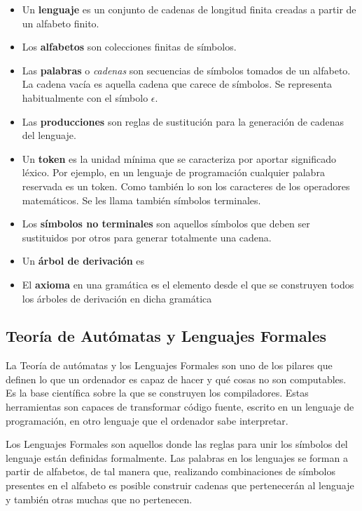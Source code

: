 \begin{itemize}
    \item Un \textbf{lenguaje} es un conjunto de cadenas de longitud finita creadas a partir de un alfabeto finito.
    \item Los \textbf{alfabetos} son colecciones finitas de símbolos.
    \item Las \textbf{palabras} o \emph{cadenas} son secuencias de símbolos tomados de un alfabeto. La cadena vacía es aquella cadena que carece de símbolos. Se representa habitualmente con el símbolo $\epsilon$.
    \item Las \textbf{producciones} son reglas de sustitución para la generación de cadenas del lenguaje.
    \item Un \textbf{token} es la unidad mínima que se caracteriza por aportar significado léxico. Por ejemplo, en un lenguaje de programación cualquier palabra reservada es un token. Como también lo son los caracteres de los operadores matemáticos. Se les llama también símbolos terminales.
    \item Los \textbf{símbolos no terminales} son aquellos símbolos que deben ser sustituidos por otros para generar totalmente una cadena.
    \item Un \textbf{árbol de derivación} es
    \item El \textbf{axioma} en una gramática es el elemento desde el que se construyen todos los árboles de derivación en dicha gramática

\end{itemize}

\subsection{Teoría de Autómatas y Lenguajes Formales}

La Teoría de autómatas y los Lenguajes Formales son uno de los pilares que definen lo que un ordenador es capaz de hacer y qué cosas no son computables. Es la base científica sobre la que se construyen los compiladores. Estas herramientas son capaces de transformar código fuente, escrito en un lenguaje de programación, en otro lenguaje que el ordenador sabe interpretar.


Los Lenguajes Formales son aquellos donde las reglas para unir los símbolos del lenguaje están definidas formalmente. Las palabras en los lenguajes se forman a partir de alfabetos, de tal manera que, realizando combinaciones de símbolos presentes en el alfabeto es posible construir cadenas que pertenecerán al lenguaje y también otras muchas que no pertenecen. 

